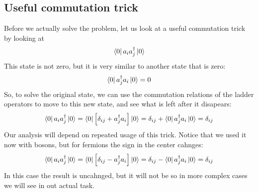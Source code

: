 \documentclass{article}
\begin{document}
\subsection{Useful commutation trick}
Before we actually solve the problem, let us look at a useful commutation trick by looking at
\begin{equation}
    \bra{0}a_i a^\dagger_j \ket{0}
\end{equation}
This state is not zero, but it is very similar to another state that is zero:
\begin{equation}
    \bra{0}a^\dagger_j a_i \ket{0} = 0
\end{equation}
So, to solve the original state, we can use the commutation relations of the ladder operators to move to this new state, and see what is left after it disapears:
\begin{equation}
    \bra{0}a_i a^\dagger_j \ket{0} =
    \bra{0}\left[\delta_{ij} + a^\dagger_j a_i\right]\ket{0} =
    \delta_{ij} + \bra{0}a^\dagger_j a_i\ket{0} = \delta_{ij}
\end{equation}
Our analysis will depend on repeated usage of this trick. Notice that we used it now with bosons, but for fermions the sign in the center cahnges:
\begin{equation}
    \bra{0}a_i a^\dagger_j \ket{0} =
    \bra{0}\left[\delta_{ij} - a^\dagger_j a_i\right]\ket{0} =
    \delta_{ij} - \bra{0}a^\dagger_j a_i\ket{0} = \delta_{ij}
\end{equation}
In this case the result is uncahnged, but it will not be so in more complex cases we will see in out actual task.
\end{document}
